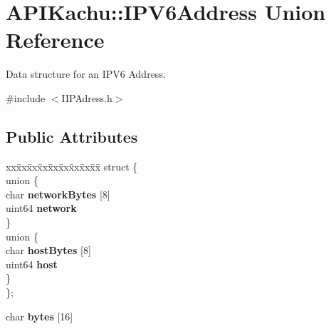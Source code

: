 \hypertarget{union_a_p_i_kachu_1_1_i_p_v6_address}{}\section{A\+P\+I\+Kachu\+:\+:I\+P\+V6\+Address Union Reference}
\label{union_a_p_i_kachu_1_1_i_p_v6_address}


Data structure for an I\+P\+V6 Address.  




{\ttfamily \#include $<$I\+I\+P\+Adress.\+h$>$}

\subsection*{Public Attributes}
\begin{DoxyCompactItemize}
\item 
\begin{tabbing}
xx\=xx\=xx\=xx\=xx\=xx\=xx\=xx\=xx\=\kill
struct \{\\
\>union \{\\
\>\>char {\bfseries networkBytes} \mbox{[}8\mbox{]}\\
\>\>uint64 {\bfseries network}\\
\>\} \hypertarget{struct_a_p_i_kachu_1_1_i_p_v6_address_1_1_0D0_a0c45af265efe0755387451310ff96b05}{}\label{struct_a_p_i_kachu_1_1_i_p_v6_address_1_1_0D0_a0c45af265efe0755387451310ff96b05}
\\
\>union \{\\
\>\>char {\bfseries hostBytes} \mbox{[}8\mbox{]}\\
\>\>uint64 {\bfseries host}\\
\>\} \hypertarget{struct_a_p_i_kachu_1_1_i_p_v6_address_1_1_0D0_a71822f00321e77021398ec740db4bb73}{}\label{struct_a_p_i_kachu_1_1_i_p_v6_address_1_1_0D0_a71822f00321e77021398ec740db4bb73}
\\
\}; \hypertarget{union_a_p_i_kachu_1_1_i_p_v6_address_a998fd168c709d710627fa6edb44697bf}{}\label{union_a_p_i_kachu_1_1_i_p_v6_address_a998fd168c709d710627fa6edb44697bf}
\\

\end{tabbing}\item 
char {\bfseries bytes} \mbox{[}16\mbox{]}\hypertarget{union_a_p_i_kachu_1_1_i_p_v6_address_aa5ad968e981279d5282f6ee5245f777a}{}\label{union_a_p_i_kachu_1_1_i_p_v6_address_aa5ad968e981279d5282f6ee5245f777a}

\end{DoxyCompactItemize}


